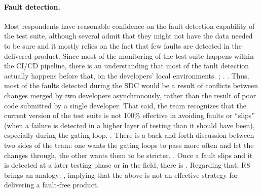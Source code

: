 \paragraph{Fault detection.} Most respondents have reasonable confidence on the fault detection capability of the test suite, although several admit that they might not have the data needed to be sure and it mostly relies on the fact that few faults are detected in the delivered product.
Since most of the monitoring of the test suite happens within the CI/CD pipeline, there is an understanding that most of the fault detection actually happens before that, on the developers' local environments.
; .
.
Thus, most of the faults detected during the SDC would be a result of conflicts between changes merged by two developers asynchronously, rather than the result of poor code submitted by a single developer.
That said, the team recognizes that the current version of the test suite is not 100\% effective in avoiding faults or ``slips'' (when a failure is detected in a higher layer of testing than it should have been), especially during the gating loop.
.
There is a back-and-forth discussion between two sides of the team: one wants the gating loops to pass more often and let the changes through, the other wants them to be stricter.
.
Once a fault slips and it is detected at a later testing phase or in the field, there is .
Regarding that, R8 brings an analogy: , implying that the above is not an effective strategy for delivering a fault-free product.

